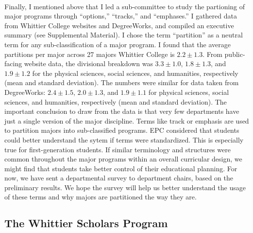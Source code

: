 \documentclass[../../../main.tex]{subfiles}
\begin{document}
\\
\vspace{0.25cm}
Finally, I mentioned above that I led a sub-committee to study the partioning of major programs through ``options,'' ``tracks,'' and ``emphases.''  I gathered data from Whittier College websites and DegreeWorks, and compiled an executive summary (see Supplemental Material).  I chose the term ``partition'' as a neutral term for any sub-classification of a major program.  I found that the average partitions per major across 27 majors Whittier College is $2.2 \pm 1.3$.  From public-facing website data, the divisional breakdown was $3.3 \pm 1.0$, $1.8 \pm 1.3$, and $1.9 \pm 1.2$ for the physical sciences, social sciences, and humanities, respectively (mean and standard deviation).  The numbers were similar for data taken from DegreeWorks: $2.4 \pm 1.5$, $2.0 \pm 1.3$, and $1.9 \pm 1.1$ for physical sciences, social sciences, and humanities, respectively (mean and standard deviation).  The important conclusion to draw from the data is that very few departments have just a single version of the major discipline.  Terms like track or emphasis are used to partition majors into sub-classified programs.  EPC considered that students could better understand the sytem if terms were standardized.  This is especially true for first-generation students.  If similar terminology and structures were common throughout the major programs within an overall curricular design, we might find that students take better control of their educational planning.  For now, we have sent a departmental survey to department chairs, based on the preliminary results.  We hope the survey will help us better understand the usage of these terms and why majors are partitioned the way they are.

\subsection{The Whittier Scholars Program}
\end{document}
